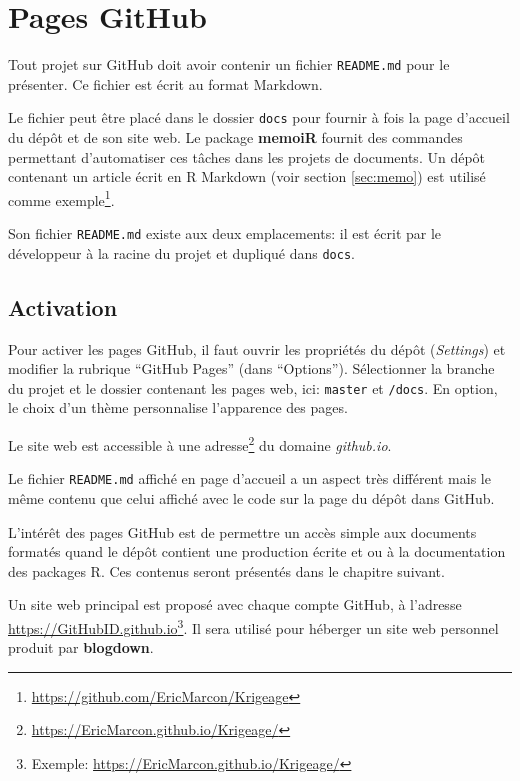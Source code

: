 \documentclass[
  12pt,
  french,
  a4paper,
  extrafontsizes,onecolumn,openright
  ]{memoir}
\begin{document}
\normalsize

\section{Pages GitHub}\label{sec:github-pages}

Tout projet sur GitHub doit avoir contenir un fichier \texttt{README.md} pour le présenter.
Ce fichier est écrit au format Markdown.

Le fichier peut être placé dans le dossier \texttt{docs} pour fournir à fois la page d'accueil du dépôt et de son site web.
Le package \textbf{memoiR} fournit des commandes permettant d'automatiser ces tâches dans les projets de documents.
Un dépôt contenant un article écrit en R Markdown (voir section \ref{sec:memo}) est utilisé comme exemple\footnote{\url{https://github.com/EricMarcon/Krigeage}}.

Son fichier \texttt{README.md} existe aux deux emplacements: il est écrit par le développeur à la racine du projet et dupliqué dans \texttt{docs}.

\subsection{Activation}\label{activation}

Pour activer les pages GitHub, il faut ouvrir les propriétés du dépôt (\emph{Settings}) et modifier la rubrique \enquote{GitHub Pages} (dans \enquote{Options}).
Sélectionner la branche du projet et le dossier contenant les pages web, ici: \texttt{master} et \texttt{/docs}.
En option, le choix d'un thème personnalise l'apparence des pages.

Le site web est accessible à une adresse\footnote{\url{https://EricMarcon.github.io/Krigeage/}} du domaine \emph{github.io}.

Le fichier \texttt{README.md} affiché en page d'accueil a un aspect très différent mais le même contenu que celui affiché avec le code sur la page du dépôt dans GitHub.

L'intérêt des pages GitHub est de permettre un accès simple aux documents formatés quand le dépôt contient une production écrite et ou à la documentation des packages R.
Ces contenus seront présentés dans le chapitre suivant.

Un site web principal est proposé avec chaque compte GitHub, à l'adresse \url{https://GitHubID.github.io}\footnote{Exemple: \url{https://EricMarcon.github.io/Krigeage/}}.
Il sera utilisé pour héberger un site web personnel produit par \textbf{blogdown}.
\end{document}
